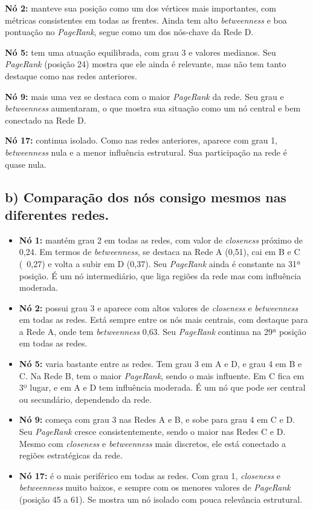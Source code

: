 \documentclass[a4paper]{article}
\begin{document}
\textbf{Nó 2:} manteve sua posição como um dos vértices mais importantes, com métricas consistentes em todas as frentes. Ainda tem alto \textit{betweenness} e boa pontuação no \textit{PageRank}, segue como um dos nós-chave da Rede D.

\textbf{Nó 5:} tem uma atuação equilibrada, com grau 3 e valores medianos. Seu \textit{PageRank} (posição 24) mostra que ele ainda é relevante, mas não tem tanto destaque como nas redes anteriores.

\textbf{Nó 9:} mais uma vez se destaca com o maior \textit{PageRank} da rede. Seu grau e \textit{betweenness} aumentaram, o que mostra sua situação como um nó central e bem conectado na Rede D.

\textbf{Nó 17:} continua isolado. Como nas redes anteriores, aparece com grau 1, \textit{betweenness} nula e a menor influência estrutural. Sua participação na rede é quase nula.


\subsection*{b) Comparação dos nós consigo mesmos nas diferentes redes.}

\begin{itemize}
    \item \textbf{Nó 1:} mantém grau 2 em todas as redes, com valor de \textit{closeness} próximo de 0{,}24. Em termos de \textit{betweenness}, se destaca na Rede A (0{,}51), cai em B e C (~0{,}27) e volta a subir em D (0{,}37). Seu \textit{PageRank} ainda é constante na 31ª posição. É um nó intermediário, que liga regiões da rede mas com influência moderada.

    \item \textbf{Nó 2:} possui grau 3 e aparece com altos valores de \textit{closeness} e \textit{betweenness} em todas as redes. Está sempre entre os nós mais centrais, com destaque para a Rede A, onde tem \textit{betweenness} 0{,}63. Seu \textit{PageRank} continua na 29ª posição em todas as redes.

    \item \textbf{Nó 5:} varia bastante entre as redes. Tem grau 3 em A e D, e grau 4 em B e C. Na Rede B, tem o maior \textit{PageRank}, sendo o mais influente. Em C fica em 3º lugar, e em A e D tem influência moderada. É um nó que pode ser central ou secundário, dependendo da rede.

    \item \textbf{Nó 9:} começa com grau 3 nas Redes A e B, e sobe para grau 4 em C e D. Seu \textit{PageRank} cresce consistentemente, sendo o maior nas Redes C e D. Mesmo com \textit{closeness} e \textit{betweenness} mais discretos, ele está conectado a regiões estratégicas da rede.

    \item \textbf{Nó 17:} é o mais periférico em todas as redes. Com grau 1, \textit{closeness} e \textit{betweenness} muito baixos, e sempre com os menores valores de \textit{PageRank} (posição 45 a 61). Se mostra um nó isolado com pouca relevância estrutural.
\end{itemize}
\end{document}
